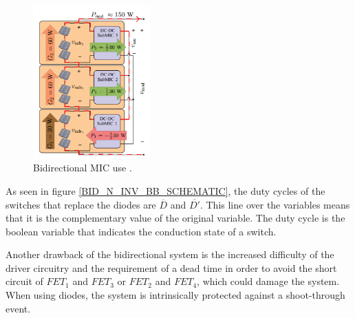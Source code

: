 \begin{figure}[H]
	\begin{center}
		\includegraphics[width=0.4\textwidth]{../Pictures/bidirectional_mic_use}
		\caption{Bidirectional MIC use \cite{ArchitectureMIC}.}
		\label{BID_MIC_ARCHITECTURES}
	\end{center}	
\end{figure}
		
As seen in figure \ref{BID_N_INV_BB_SCHEMATIC}, the duty cycles of the switches that replace the diodes are $\overline{D}$ and $\overline{D'}$. This line over the variables means that it is the complementary value of the original variable. The duty cycle is the boolean variable that indicates the conduction state of a switch. 
		
Another drawback of the bidirectional system is the increased difficulty of the driver circuitry and the requirement of a dead time in order to avoid the short circuit of $FET_1$ and $FET_3$ or $FET_2$ and $FET_4$, which could damage the system. When using diodes, the system is intrinsically protected against a shoot-through event.
		
